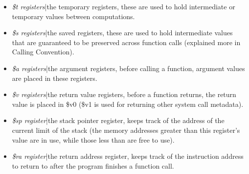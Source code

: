 \documentclass{article}
\begin{document}
\begin{itemize}
\item \textit{\$t registers}|the temporary registers, these are used to hold intermediate or temporary values between computations.
\item \textit{\$s registers}|the saved registers, these are used to hold intermediate values that are guaranteed to be preserved across function calls (explained more in Calling Convention).
\item \textit{\$a registers}|the argument registers, before calling a function, argument values are placed in these registers.
\item \textit{\$v registers}|the return value registers, before a function returns, the return value is placed in \$v0 (\$v1 is used for returning other system call metadata).
\item \textit{\$sp register}|the stack pointer register, keeps track of the address of the current limit of the stack (the memory addresses greater than this register's value are in use, while those less than are free to use).
\item \textit{\$ra register}|the return address register, keeps track of the instruction address to return to after the program finishes a function call.
\end{itemize}
\end{document}
